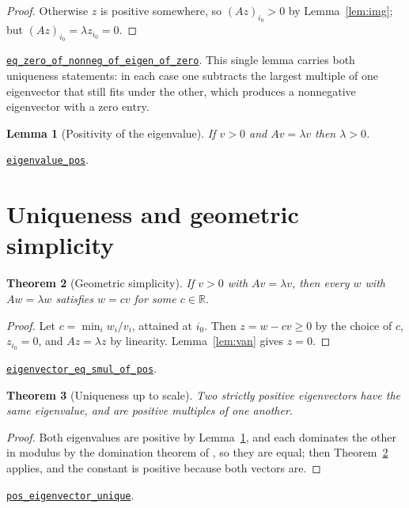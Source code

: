 \documentclass[11pt]{article}
\newtheorem{theorem}{Theorem}[section]
\newtheorem{lemma}[theorem]{Lemma}
\theoremstyle{definition}
\newcommand{\anchor}{08a9050201287a31d20fc4339cc5c6c64b1391fb}
\newcommand{\osline}[3]{%
  \href{https://github.com/lluiseriksson/THE-ERIKSSON-PROGRAMME/blob/\anchor/YangMills/OS/#1.lean\#L#2}{\nolinkurl{#3}}}
\newcommand{\R}{\mathbb{R}}
\begin{document}
\begin{proof}
Otherwise $z$ is positive somewhere, so $(Az)_{i_0}>0$ by
Lemma~\ref{lem:img}; but $(Az)_{i_0}=\lambda z_{i_0}=0$.
\end{proof}

\osline{PerronKernel}{100}{eq\_zero\_of\_nonneg\_of\_eigen\_of\_zero}.  This
single lemma carries both uniqueness statements: in each case one subtracts the
largest multiple of one eigenvector that still fits under the other, which
produces a nonnegative eigenvector with a zero entry.

\begin{lemma}[Positivity of the eigenvalue]\label{lem:eigpos}
If $v>0$ and $Av=\lambda v$ then $\lambda>0$.
\end{lemma}

\osline{PerronKernel}{87}{eigenvalue\_pos}.

\section{Uniqueness and geometric simplicity}

\begin{theorem}[Geometric simplicity]\label{thm:simple}
If $v>0$ with $Av=\lambda v$, then every $w$ with $Aw=\lambda w$ satisfies
$w=cv$ for some $c\in\R$.
\end{theorem}

\begin{proof}
Let $c=\min_i w_i/v_i$, attained at $i_0$.  Then $z=w-cv\ge0$ by the choice of
$c$, $z_{i_0}=0$, and $Az=\lambda z$ by linearity.  Lemma~\ref{lem:van} gives
$z=0$.
\end{proof}

\osline{PerronKernel}{113}{eigenvector\_eq\_smul\_of\_pos}.

\begin{theorem}[Uniqueness up to scale]\label{thm:unique}
Two strictly positive eigenvectors have the same eigenvalue, and are positive
multiples of one another.
\end{theorem}

\begin{proof}
Both eigenvalues are positive by Lemma~\ref{lem:eigpos}, and each dominates the
other in modulus by the domination theorem of \cite{ErikssonBirkhoff}, so they
are equal; then Theorem~\ref{thm:simple} applies, and the constant is positive
because both vectors are.
\end{proof}

\osline{PerronKernel}{148}{pos\_eigenvector\_unique}.
\end{document}
